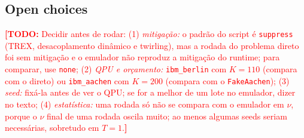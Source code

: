 \documentclass[floatfix,aps,pra,twocolumn,superscriptaddress,10pt,nofootinbib]{revtex4-2}
\newif\ifshowtodos \showtodostrue
\newcommand{\TODO}[1]{\ifshowtodos\textcolor{red}{\textbf{[TODO:} #1\textbf{]}}\fi}
\begin{document}
\begin{appendices}
\subsection{Open choices}\label{app:iopen}
\TODO{Decidir antes de rodar:
(1) \emph{mitiga\c{c}\~ao:} o padr\~ao do script \'e \texttt{suppress} (TREX, desacoplamento din\^amico e twirling), mas a rodada do problema direto foi sem mitiga\c{c}\~ao e o emulador n\~ao reproduz a mitiga\c{c}\~ao do runtime; para comparar, use \texttt{none};
(2) \emph{QPU e or\c{c}amento:} \texttt{ibm\_berlin} com $K=110$ (compara com o direto) ou \texttt{ibm\_aachen} com $K=200$ (compara com o \texttt{FakeAachen});
(3) \emph{seed:} fix\'a-la antes de ver o QPU; se for a melhor de um lote no emulador, dizer no texto;
(4) \emph{estat\'istica:} uma rodada s\'o n\~ao se compara com o emulador em $\nu$, porque o $\nu$ final de uma rodada oscila muito; ao menos algumas seeds seriam necess\'arias, sobretudo em $T=1$.}

\end{appendices}


\end{document}

